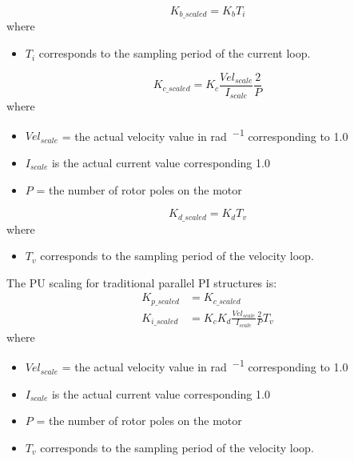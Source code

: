 \begin{enumerate}
    \begin{equation}
        K_{b\_scaled} = K_b T_i
    \end{equation}
    where
    \begin{itemize}
        \item $T_i$ corresponds to the sampling period of the current loop.
    \end{itemize}

    \begin{equation}
        K_{c\_scaled} = K_c \frac{Vel_{scale}}{I_{scale}}\frac{2}{P}
    \end{equation}
    where
    \begin{itemize}
        \item $Vel_{scale}$ = the actual velocity value in \unit{\radian\per\sec} corresponding to \num{1.0}
        \item $I_{scale}$ is the actual current value corresponding \num{1.0}
        \item $P$ = the number of rotor poles on the motor
    \end{itemize}

    \begin{equation}
        K_{d\_scaled} = K_d T_v
    \end{equation}
    where
    \begin{itemize}
        \item $T_v$ corresponds to the sampling period of the velocity loop.
    \end{itemize}

    The PU scaling for traditional parallel PI structures is:
    \begin{align}
        K_{p\_scaled} &= K_{c\_scaled} \\
        K_{i\_scaled} &= K_c K_d \frac{Vel_{scale}}{I_{scale}}\frac{2}{P}T_v
    \end{align}
    where
    \begin{itemize}
        \item $Vel_{scale}$ = the actual velocity value in \unit{\radian\per\sec} corresponding to \num{1.0}
        \item $I_{scale}$ is the actual current value corresponding \num{1.0}
        \item $P$ = the number of rotor poles on the motor
        \item $T_v$ corresponds to the sampling period of the velocity loop.
    \end{itemize}
\end{enumerate}

